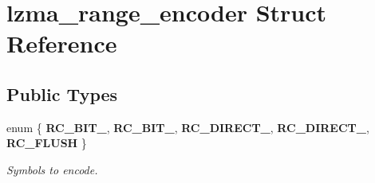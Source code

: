 \section{lzma\+\_\+range\+\_\+encoder Struct Reference}
\label{structlzma__range__encoder}
\subsection*{Public Types}
\begin{DoxyCompactItemize}
\item 
enum \{ \newline
{\bfseries R\+C\+\_\+\+B\+I\+T\+\_}, 
{\bfseries R\+C\+\_\+\+B\+I\+T\+\_}, 
{\bfseries R\+C\+\_\+\+D\+I\+R\+E\+C\+T\+\_}, 
{\bfseries R\+C\+\_\+\+D\+I\+R\+E\+C\+T\+\_}, 
\newline
{\bfseries R\+C\+\_\+\+F\+L\+U\+SH}
 \}\begin{DoxyCompactList}\small\item\em Symbols to encode. \end{DoxyCompactList}
\end{DoxyCompactItemize}
